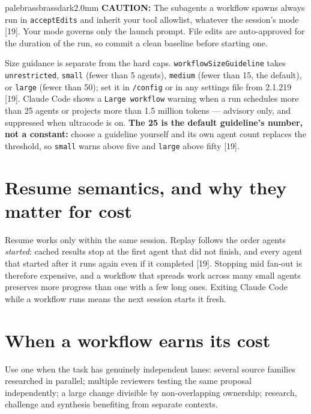 \documentclass[11pt,a4paper,twoside,openany]{book}
\begin{document}
\begin{calloutbox}{palebrass}{brassdark}{2.0mm}
\textbf{CAUTION:} The subagents a workflow spawns always run in \texttt{accept\allowbreak{}Edits} and inherit your tool allowlist, whatever the session's mode [19]. Your mode governs only the launch prompt. File edits are auto-approved for the duration of the run, so commit a clean baseline before starting one.
\end{calloutbox}

Size guidance is separate from the hard caps. \texttt{workflow\allowbreak{}Size\allowbreak{}Guideline} takes \texttt{unrestricte\allowbreak{}d}, \texttt{small} (fewer than 5 agents), \texttt{medium} (fewer than 15, the default), or \texttt{large} (fewer than 50); set it in \texttt{/\allowbreak{}config} or in any settings file from 2.1.219 [19]. Claude Code shows a \texttt{Large workf\allowbreak{}low} warning when a run schedules more than 25 agents or projects more than 1.5 million tokens — advisory only, and suppressed when ultracode is on. \textbf{The 25 is the default guideline's number, not a constant:} choose a guideline yourself and its own agent count replaces the threshold, so \texttt{small} warns above five and \texttt{large} above fifty [19].


\FloatBarrier
\setcounter{section}{2}
\section{Resume semantics, and why they matter for cost}

Resume works only within the same session. Replay follows the order agents \emph{started}: cached results stop at the first agent that did not finish, and every agent that started after it runs again even if it completed [19]. Stopping mid fan-out is therefore expensive, and a workflow that spreads work across many small agents preserves more progress than one with a few long ones. Exiting Claude Code while a workflow runs means the next session starts it fresh.


\FloatBarrier
\setcounter{section}{3}
\section{When a workflow earns its cost}

Use one when the task has genuinely independent lanes: several source families researched in parallel; multiple reviewers testing the same proposal independently; a large change divisible by non-overlapping ownership; research, challenge and synthesis benefiting from separate contexts.
\end{document}
